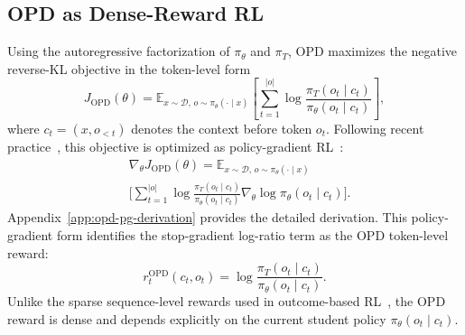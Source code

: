 \subsection{OPD as Dense-Reward RL}
\label{sec:opd-as-rl}

Using the autoregressive factorization of $\pi_\theta$ and $\pi_T$, OPD maximizes the negative reverse-KL objective in the token-level form
\[
J_{\mathrm{OPD}}(\theta)
=
\mathbb{E}_{x \sim \mathcal{D},\, o \sim \pi_\theta(\cdot \mid x)}
\left[
\sum_{t=1}^{|o|}
\log
\frac{
\pi_T(o_t \mid c_t)
}{
\pi_\theta(o_t \mid c_t)
}
\right],
\]
where $c_t=(x,o_{<t})$ denotes the context before token $o_t$. Following recent practice~\citep{kevin2025opd, ko2026reopold, oh2026kl}, this objective is optimized as policy-gradient RL~\citep{williams1992reinforce, sutton1999policygrad}:
\[
\begin{aligned}
&\nabla_\theta J_{\mathrm{OPD}}(\theta)
=
\mathbb{E}_{x \sim \mathcal{D},\, o \sim \pi_\theta(\cdot \mid x)}\\
&\Bigg[
\sum_{t=1}^{|o|}
\log
\frac{\pi_T(o_t \mid c_t)}
{\pi_\theta(o_t \mid c_t)}
\nabla_\theta \log \pi_\theta(o_t \mid c_t)
\Bigg].
\end{aligned}
\]
Appendix~\ref{app:opd-pg-derivation} provides the detailed derivation. This policy-gradient form identifies the stop-gradient log-ratio term as the OPD token-level reward:
\begin{equation}
r_t^{\mathrm{OPD}}(c_t,o_t)
=
\log
\frac{
\pi_T(o_t \mid c_t)
}{
\pi_\theta(o_t \mid c_t)
}.
\label{eq:opd-token-reward}
\end{equation}
Unlike the sparse sequence-level rewards used in outcome-based RL~\citep{deepseekmath, deepseekr1}, the OPD reward is dense and depends explicitly on the current student policy $\pi_\theta(o_t \mid c_t)$.